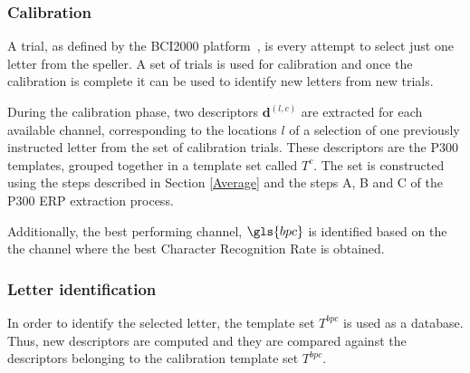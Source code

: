 \subsubsection{Calibration}

A trial, as defined by the BCI2000 platform~\cite{Schalk2004}, is every attempt to select just one letter from the speller.  A set of trials is used for calibration and once the calibration is complete it can be used to identify new letters from new trials.

During the calibration phase, two descriptors $ \mathbf{d}^{(l,c)}$ are extracted for each available channel, corresponding to the locations $l$ of a selection of one previously instructed letter from the set of calibration trials.  These descriptors are the P300 templates, grouped together in a template set called $ T^c $.   The set is constructed using the steps described in Section \ref{Average} and the steps A, B and C of the P300 ERP extraction process.

Additionally, the best performing channel, $\gls{bpc}$ is identified based on the the channel where the best Character Recognition Rate is obtained.

\subsubsection{Letter identification}

In order to identify the selected letter, the template set $T^{bpc}$ is used as a database.  Thus, new descriptors are computed and they are compared against the descriptors belonging to the calibration template set $T^{bpc}$.

